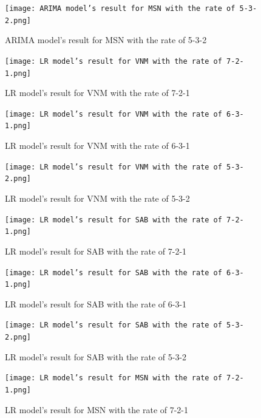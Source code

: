 \documentclass{ieeeojies}
\begin{document}
   \begin{figure}[H]
    \centering
    \begin{minipage}{0.23\textwidth}
    \centering
    \texttt{[image: ARIMA model’s result for MSN with the rate of 5-3-2.png]}
    \caption{ARIMA model’s result for MSN with the rate of 5-3-2}
    \end{minipage}
    \hfill
    \begin{minipage}{0.23\textwidth}
    \centering
    \texttt{[image: LR model’s result for VNM with the rate of 7-2-1.png]}
    \caption{LR model’s result for VNM with the rate of 7-2-1}
    \end{minipage}
    \end{figure}
    \begin{figure}[H]
    \begin{minipage}{0.23\textwidth}
    \centering
    \texttt{[image: LR model’s result for VNM with the rate of 6-3-1.png]}
    \caption{LR model’s result for VNM with the rate of 6-3-1}
    \end{minipage}
    \hfill
    \begin{minipage}{0.23\textwidth}
    \centering
    \texttt{[image: LR model’s result for VNM with the rate of 5-3-2.png]}
    \caption{LR model’s result for VNM with the rate of 5-3-2}
    \end{minipage}
   \end{figure}
   
   \begin{figure}[H]
    \centering
    \begin{minipage}{0.23\textwidth}
    \centering
    \texttt{[image: LR model’s result for SAB with the rate of 7-2-1.png]}
    \caption{LR model’s result for SAB with the rate of 7-2-1}
    \end{minipage}
    \hfill
    \begin{minipage}{0.23\textwidth}
    \centering
    \texttt{[image: LR model’s result for SAB with the rate of 6-3-1.png]}
    \caption{LR model’s result for SAB with the rate of 6-3-1}
    \end{minipage}
    \end{figure}
    
    \begin{figure}[H]
    \begin{minipage}{0.23\textwidth}
    \centering
    \texttt{[image: LR model’s result for SAB with the rate of 5-3-2.png]}
    \caption{LR model’s result for SAB with the rate of 5-3-2}
    \end{minipage}
    \hfill
    \begin{minipage}{0.23\textwidth}
    \centering
    \texttt{[image: LR model’s result for MSN with the rate of 7-2-1.png]}
    \caption{LR model’s result for MSN with the rate of 7-2-1}
    \end{minipage}
   \end{figure}
\end{document}
